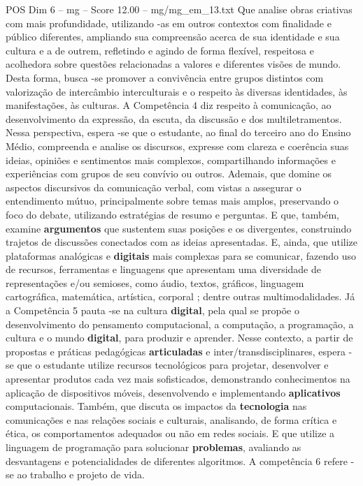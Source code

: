 \begin{textsample}{POS Dim 6 – mg – Score 12.00 – mg/mg\_em\_13.txt}
Que analise obras criativas com mais profundidade, utilizando -as em outros contextos com finalidade e público diferentes, ampliando sua compreensão acerca de sua identidade e sua cultura e a de outrem, refletindo e agindo de forma flexível, respeitosa e acolhedora sobre questões relacionadas a valores e diferentes visões de mundo.
Desta forma, busca -se promover a convivência entre grupos distintos com valorização de intercâmbio interculturais e o respeito às diversas identidades, às manifestações, às culturas.
A Competência 4 diz respeito à comunicação, ao desenvolvimento da expressão, da escuta, da discussão e dos multiletramentos.
Nessa perspectiva, espera -se que o estudante, ao final do terceiro ano do Ensino Médio, compreenda e analise os discursos, expresse com clareza e coerência suas ideias, opiniões e sentimentos mais complexos, compartilhando informações e experiências com grupos de seu convívio ou outros.
Ademais, que domine os aspectos discursivos da comunicação verbal, com vistas a assegurar o entendimento mútuo, principalmente sobre temas mais amplos, preservando o foco do debate, utilizando estratégias de resumo e perguntas.
E que, também, examine \textbf{argumentos} que sustentem suas posições e os divergentes, construindo trajetos de discussões conectados com as ideias apresentadas.
E, ainda, que utilize plataformas analógicas e \textbf{digitais} mais complexas para se comunicar, fazendo uso de recursos, ferramentas e linguagens que apresentam uma diversidade de representações e/ou semioses, como áudio, textos, gráficos, linguagem cartográfica, matemática, artística, corporal ; dentre outras multimodalidades.
Já a Competência 5 pauta -se na cultura \textbf{digital}, pela qual se propõe o desenvolvimento do pensamento computacional, a computação, a programação, a cultura e o mundo \textbf{digital}, para produzir e aprender.
Nesse contexto, a partir de propostas e práticas pedagógicas \textbf{articuladas} e inter/transdisciplinares, espera -se que o estudante utilize recursos tecnológicos para projetar, desenvolver e apresentar produtos cada vez mais sofisticados, demonstrando conhecimentos na aplicação de dispositivos móveis, desenvolvendo e implementando \textbf{aplicativos} computacionais.
Também, que discuta os impactos da \textbf{tecnologia} nas comunicações e nas relações sociais e culturais, analisando, de forma crítica e ética, os comportamentos adequados ou não em redes sociais.
E que utilize a linguagem de programação para solucionar \textbf{problemas}, avaliando as desvantagens e potencialidades de diferentes algoritmos.
A competência 6 refere -se ao trabalho e projeto de vida.

\end{textsample}

